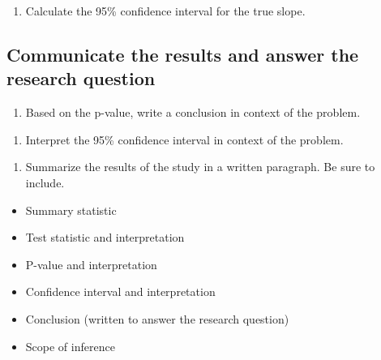 \documentclass[
]{report}
\providecommand{\tightlist}{%
  \setlength{\itemsep}{0pt}\setlength{\parskip}{0pt}}
\begin{document}
\begin{enumerate}
\def\labelenumi{\arabic{enumi}.}
\setcounter{enumi}{15}
\tightlist
\item
  Calculate the 95\% confidence interval for the true slope.
  \vspace{1in}
\end{enumerate}

\hypertarget{communicate-the-results-and-answer-the-research-question}{%
\subsection{Communicate the results and answer the research question}\label{communicate-the-results-and-answer-the-research-question}}

\begin{enumerate}
\def\labelenumi{\arabic{enumi}.}
\setcounter{enumi}{16}
\tightlist
\item
  Based on the p-value, write a conclusion in context of the problem.
\end{enumerate}

\vspace{1in}

\begin{enumerate}
\def\labelenumi{\arabic{enumi}.}
\setcounter{enumi}{17}
\tightlist
\item
  Interpret the 95\% confidence interval in context of the problem.
\end{enumerate}

\vspace{1in}

\begin{enumerate}
\def\labelenumi{\arabic{enumi}.}
\setcounter{enumi}{18}
\tightlist
\item
  Summarize the results of the study in a written paragraph. Be sure to include.
\end{enumerate}

\begin{itemize}
\item
  Summary statistic
\item
  Test statistic and interpretation
\item
  P-value and interpretation
\item
  Confidence interval and interpretation
\item
  Conclusion (written to answer the research question)
\item
  Scope of inference
\end{itemize}
\end{document}

